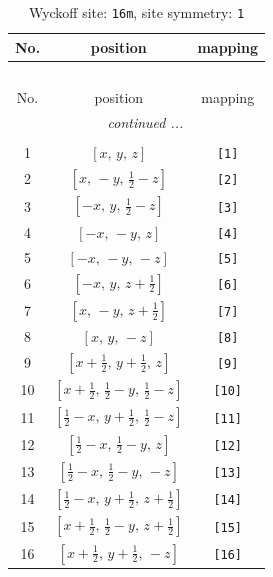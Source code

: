\documentclass[fleqn,8pt]{jsarticle}
\begin{document}
\begin{longtable}{ccc}
\caption{Wyckoff site: {\tt 16m}, site symmetry: {\tt 1}}
 \\
 \hline \hline
No. & position & mapping \\ \hline \endfirsthead

\multicolumn{2}{l}{\tablename\ \thetable{}} \\
 \hline \hline
No. & position & mapping \\ \hline \endhead

 \hline \hline
\multicolumn{2}{r}{\footnotesize\it continued ...} \\ \endfoot

 \hline \hline
\multicolumn{2}{r}{} \\ \endlastfoot

1 & $\left[ x,\, y,\, z \right]$ & {\tt [1]} \\ \hline
2 & $\left[ x,\, - y,\, \frac{1}{2} - z \right]$ & {\tt [2]} \\ \hline
3 & $\left[ - x,\, y,\, \frac{1}{2} - z \right]$ & {\tt [3]} \\ \hline
4 & $\left[ - x,\, - y,\, z \right]$ & {\tt [4]} \\ \hline
5 & $\left[ - x,\, - y,\, - z \right]$ & {\tt [5]} \\ \hline
6 & $\left[ - x,\, y,\, z + \frac{1}{2} \right]$ & {\tt [6]} \\ \hline
7 & $\left[ x,\, - y,\, z + \frac{1}{2} \right]$ & {\tt [7]} \\ \hline
8 & $\left[ x,\, y,\, - z \right]$ & {\tt [8]} \\ \hline
9 & $\left[ x + \frac{1}{2},\, y + \frac{1}{2},\, z \right]$ & {\tt [9]} \\ \hline
10 & $\left[ x + \frac{1}{2},\, \frac{1}{2} - y,\, \frac{1}{2} - z \right]$ & {\tt [10]} \\ \hline
11 & $\left[ \frac{1}{2} - x,\, y + \frac{1}{2},\, \frac{1}{2} - z \right]$ & {\tt [11]} \\ \hline
12 & $\left[ \frac{1}{2} - x,\, \frac{1}{2} - y,\, z \right]$ & {\tt [12]} \\ \hline
13 & $\left[ \frac{1}{2} - x,\, \frac{1}{2} - y,\, - z \right]$ & {\tt [13]} \\ \hline
14 & $\left[ \frac{1}{2} - x,\, y + \frac{1}{2},\, z + \frac{1}{2} \right]$ & {\tt [14]} \\ \hline
15 & $\left[ x + \frac{1}{2},\, \frac{1}{2} - y,\, z + \frac{1}{2} \right]$ & {\tt [15]} \\ \hline
16 & $\left[ x + \frac{1}{2},\, y + \frac{1}{2},\, - z \right]$ & {\tt [16]} \\
\end{longtable}
\end{document}
